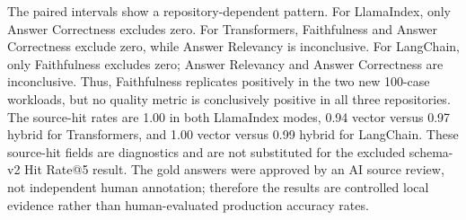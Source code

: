 \documentclass[12pt,letterpaper,oneside]{report}
\begin{document}
\begin{table}[H]
    \centering
    \caption{Answer quality by repository with paired case-level 95\% confidence intervals}
    \label{tab:answer_quality_results}
\end{table}

The paired intervals show a repository-dependent pattern. For LlamaIndex, only Answer Correctness excludes zero. For Transformers, Faithfulness and Answer Correctness exclude zero, while Answer Relevancy is inconclusive. For LangChain, only Faithfulness excludes zero; Answer Relevancy and Answer Correctness are inconclusive. Thus, Faithfulness replicates positively in the two new 100-case workloads, but no quality metric is conclusively positive in all three repositories. The source-hit rates are 1.00 in both LlamaIndex modes, 0.94 vector versus 0.97 hybrid for Transformers, and 1.00 vector versus 0.99 hybrid for LangChain. These source-hit fields are diagnostics and are not substituted for the excluded schema-v2 Hit Rate@5 result. The gold answers were approved by an AI source review, not independent human annotation; therefore the results are controlled local evidence rather than human-evaluated production accuracy rates.
\end{document}
